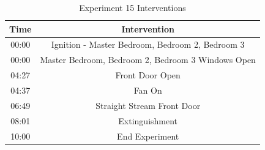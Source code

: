 \documentclass{article}
\begin{document}
\begin{table}[H]
	\centering
	\caption{Experiment 15 Interventions}
	\begin{tabular}{|c|c|} 
		\hline
		Time & Intervention \\ \hline \hline
		00:00 & Ignition - Master Bedroom, Bedroom 2, Bedroom 3 \\ \hline
		00:00 & Master Bedroom, Bedroom 2, Bedroom 3 Windows Open \\ \hline
		04:27 & Front Door Open \\ \hline
		04:37 & Fan On \\ \hline
		06:49 & Straight Stream Front Door \\ \hline
		08:01 & Extinguishment \\ \hline
		10:00 & End Experiment \\ \hline
	\end{tabular}
	\label{Table:Exp15Interventions}
\end{table}

\clearpage
\end{document}
